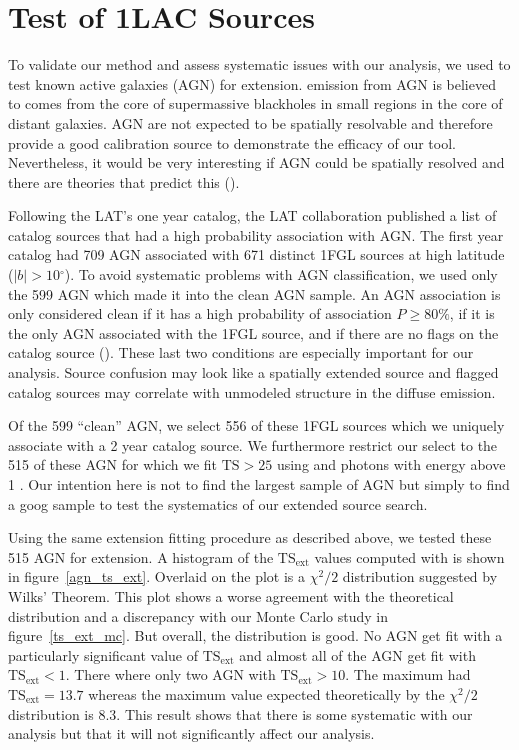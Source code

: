\documentclass[12pt,preprint]{aastex}
\newcommand{\gev}{\text{GeV}\xspace}
\newcommand{\tsext}{{\ensuremath{\text{TS}_\text{ext}}}\xspace}
\newcommand{\ts}{\text{TS}\xspace}
\renewcommand{\deg}{\ensuremath{^\circ}\xspace}
\newcommand{\pointlike}{\text{\em pointlike}\xspace}
\begin{document}
\section{Test of 1LAC Sources}

To validate our method and assess systematic issues with our analysis,
we used \pointlike to test known active galaxies (AGN) for extension.
\gev emission from AGN is believed to comes from the core of supermassive
blackholes in small regions in the core of distant galaxies.  AGN are
not expected to be spatially resolvable and therefore provide a good
calibration source to demonstrate the efficacy of our tool. Nevertheless,
it would be very interesting if AGN could be spatially resolved and
there are theories that predict this (\cite{pair_halo_paper}).

Following the LAT's one year catalog, the LAT collaboration published
a list of catalog sources that had a high probability association with
AGN. The first year catalog had 709 AGN associated with 671 distinct
1FGL sources at high latitude ($|b|>10\deg$).  To avoid systematic
problems with AGN classification, we used only the 599 AGN which made
it into the clean AGN sample.  An AGN association is only considered
clean if it has a high probability of association $P\ge 80\%$, if it is
the only AGN associated with the 1FGL source, and if there are no flags
on the catalog source (\cite{first_cat}). These last two conditions are
especially important for our analysis.  Source confusion may look like
a spatially extended source and flagged catalog sources may correlate
with unmodeled structure in the diffuse emission.

Of the 599 ``clean'' AGN, we select 556 of these 1FGL sources which
we uniquely associate with a 2 year catalog source. We furthermore
restrict our select to the 515 of these AGN for which we fit $\ts>25$
using \pointlike and photons with energy above 1 \gev.  Our intention
here is not to find the largest sample of AGN but simply
to find a goog sample to test the systematics of our extended source
search.

Using the same extension fitting procedure as described above, we tested
these 515 AGN for extension. A histogram of the \tsext values computed
with \pointlike is shown in figure~\ref{agn_ts_ext}. Overlaid on the plot
is a $\chi^2/2$ distribution suggested by Wilks' Theorem.  This plot
shows a worse agreement with the theoretical distribution and
a discrepancy with 
our Monte Carlo study in figure~\ref{ts_ext_mc}.  But overall, the
distribution is good. No AGN get fit with a particularly significant
value of $\tsext$ and almost all of the AGN get fit with $\tsext<1$.
There where only two AGN with $\tsext>10$. The maximum had $\tsext=13.7$
whereas the maximum value expected theoretically by the $\chi^2/2$ distribution is
8.3. This result shows that there is some systematic with our
analysis but that it will not significantly affect our analysis.
\end{document}
